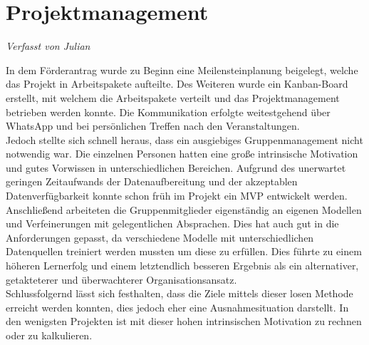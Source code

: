 \documentclass[../main.tex]{subfiles}
\begin{document}
\chapter{Projektmanagement}
\vspace{-0.5cm}
\noindent\textit{\small Verfasst von Julian}
\vspace{0.5cm}


In dem Förderantrag wurde zu Beginn eine Meilensteinplanung beigelegt, welche das Projekt in Arbeitspakete aufteilte.
Des Weiteren wurde ein Kanban-Board erstellt, mit welchem die Arbeitspakete verteilt und das Projektmanagement betrieben werden konnte.
Die Kommunikation erfolgte weitestgehend über WhatsApp und bei persönlichen Treffen nach den Veranstaltungen. \\

Jedoch stellte sich schnell heraus, dass ein ausgiebiges Gruppenmanagement nicht notwendig war.
Die einzelnen Personen hatten eine große intrinsische Motivation und gutes Vorwissen in unterschiedlichen Bereichen.
Aufgrund des unerwartet geringen Zeitaufwands der Datenaufbereitung und der akzeptablen Datenverfügbarkeit konnte schon früh im Projekt ein MVP entwickelt werden.
Anschließend arbeiteten die Gruppenmitglieder eigenständig an eigenen Modellen und Verfeinerungen mit gelegentlichen Absprachen.
Dies hat auch gut in die Anforderungen gepasst, da verschiedene Modelle mit unterschiedlichen Datenquellen treiniert werden mussten um diese zu erfüllen.
Dies führte zu einem höheren Lernerfolg und einem letztendlich besseren Ergebnis als ein alternativer, getakteterer und überwachterer Organisationsansatz. \\

Schlussfolgernd lässt sich festhalten, dass die Ziele mittels dieser losen Methode erreicht werden konnten, dies jedoch eher eine Ausnahmesituation darstellt.
In den wenigsten Projekten ist mit dieser hohen intrinsischen Motivation zu rechnen oder zu kalkulieren.
\end{document}
